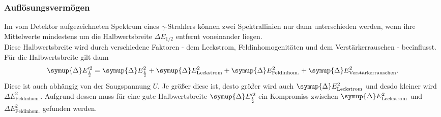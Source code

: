 \subsubsection{Auflösungsvermögen}
Im vom Detektor aufgezeichneten Spektrum eines $\gamma$-Strahlers können zwei Spektrallinien
nur dann unterschieden werden, wenn ihre Mittelwerte mindestens um die Halbwertsbreite
$\Delta E_{1/2}$ entfernt voneinander liegen. \\
Diese Halbwertsbreite wird durch verschiedene Faktoren - dem Leckstrom, Feldinhomogenitäten und dem Verstärkerrauschen - beeinflusst. Für die Halbwertsbreite gilt dann
\begin{equation}
    \symup{\Delta}E'^2_{\frac{1}{2}} = \symup{\Delta}E^2_{\frac{1}{2}} + \symup{\Delta}E^2_\text{Leckstrom} + \symup{\Delta}E^2_\text{Feldinhom.} + \symup{\Delta}E^2_\text{Verstärkerrauschen}.
\end{equation}
Diese ist auch abhängig von der Saugspannung $U$. Je größer diese ist, desto größer wird auch $\symup{\Delta}E^2_\text{Leckstrom}$ und desdo kleiner wird ${\Delta}E^2_\text{Feldinhom.}$. Aufgrund dessen muss für eine gute Halbwertsbreite $\symup{\Delta}E'^2_{\frac{1}{2}}$ ein Kompromiss zwischen $\symup{\Delta}E^2_\text{Leckstrom}$ und ${\Delta}E^2_\text{Feldinhom.}$ gefunden werden. 